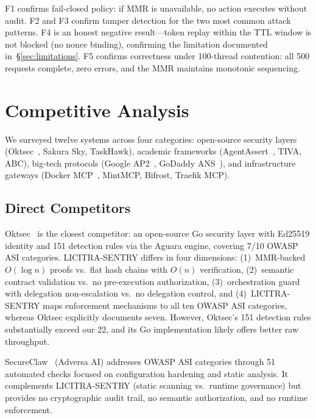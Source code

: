 \documentclass[11pt,a4paper]{article}
\begin{document}
F1 confirms fail-closed policy: if MMR is unavailable, no action executes without audit. F2
and F3 confirm tamper detection for the two most common attack patterns. F4 is an honest
negative result---token replay within the TTL window is not blocked (no nonce binding),
confirming the limitation documented in~\S\ref{sec:limitations}. F5 confirms correctness under
100-thread contention: all 500 requests complete, zero errors, and the MMR maintains monotonic
sequencing.


\section{Competitive Analysis}\label{sec:competitive}

We surveyed twelve systems across four categories: open-source security layers
(Oktsec~\cite{oktsec}, Sakura Sky, TaskHawk), academic frameworks
(AgentAssert~\cite{agentassert}, TIVA, ABC), big-tech protocols (Google
AP2~\cite{googleap2}, GoDaddy ANS~\cite{godaddyans}), and infrastructure gateways
(Docker MCP~\cite{dockermcp}, MintMCP, Bifrost, Traefik MCP).

\subsection{Direct Competitors}

Oktsec~\cite{oktsec} is the closest competitor: an open-source Go security layer with Ed25519
identity and 151 detection rules via the Aguara engine, covering 7/10 OWASP ASI categories.
LICITRA-SENTRY differs in four dimensions: (1)~MMR-backed $O(\log n)$ proofs vs.\ flat hash
chains with $O(n)$ verification, (2)~semantic contract validation vs.\ no pre-execution
authorization, (3)~orchestration guard with delegation non-escalation vs.\ no delegation
control, and (4)~LICITRA-SENTRY maps enforcement mechanisms to all ten OWASP ASI categories,
whereas Oktsec explicitly documents seven. However, Oktsec's 151 detection rules substantially
exceed our 22, and its Go implementation likely offers better raw throughput.

SecureClaw~\cite{secureclaw} (Adversa AI) addresses OWASP ASI categories through 51 automated
checks focused on configuration hardening and static analysis. It complements LICITRA-SENTRY
(static scanning vs.\ runtime governance) but provides no cryptographic audit trail, no semantic
authorization, and no runtime enforcement.
\end{document}
